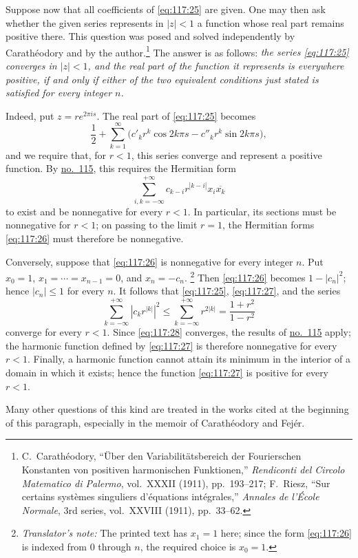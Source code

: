 \documentclass[
  paper=b5,
  fontsize=13pt,
  twoside=true,
  open=any,
  bookmarkpackage=false,
  chapterprefix=true,
  headings=normal
]{scrbook}
\theoremstyle{definition}
\newcounter{translatornote}
\newcommand{\translatornotelabel}{T\arabic{translatornote}}
\newcommand{\translatornote}[1]{%
  \stepcounter{translatornote}%
  \begingroup
    \edef\savedfootnotenumber{\number\value{footnote}}%
    \renewcommand{\thefootnote}{\translatornotelabel}%
    \footnote{\emph{Translator's note:} #1}%
    \setcounter{footnote}{\savedfootnotenumber}%
  \endgroup
}
\begin{document}
Suppose now that all coefficients of \eqref{eq:117:25} are given.  One may
then ask whether the given series represents in \(|z|<1\) a function whose
real part remains positive there.  This question was posed and solved
independently by Carathéodory and by the author.\footnote{C.~Carathéodory,
``Über den Variabilitätsbereich der Fourierschen Konstanten von positiven
harmonischen Funktionen,'' \emph{Rendiconti del Circolo Matematico di Palermo},
vol.~XXXII (1911), pp.~193--217; F.~Riesz, ``Sur certains systèmes singuliers
d'équations intégrales,'' \emph{Annales de l'École Normale}, 3rd series,
vol.~XXVIII (1911), pp.~33--62.}  The answer is as follows: \emph{the series
\eqref{eq:117:25} converges in \(|z|<1\), and the real part of the function it
represents is everywhere positive, if and only if either of the two equivalent
conditions just stated is satisfied for every integer \(n\).}

Indeed, put \(z=re^{2\pi is}\).  The real part of \eqref{eq:117:25} becomes
\begin{equation}
  \frac12+\sum_{k=1}^{\infty}
  \bigl(c'_kr^k\cos2k\pi s-c''_kr^k\sin2k\pi s\bigr),
  \tag{27}\label{eq:117:27}
\end{equation}
and we require that, for \(r<1\), this series converge and represent a
positive function.  By \hyperref[sec:115]{no.~115}, this requires the
Hermitian form
\[
  \sum_{i,k=-\infty}^{+\infty}
  c_{k-i}r^{|k-i|}x_i\overline{x_k}
\]
to exist and be nonnegative for every \(r<1\).  In particular, its sections
must be nonnegative for \(r<1\); on passing to the limit \(r=1\), the
Hermitian forms \eqref{eq:117:26} must therefore be nonnegative.

Conversely, suppose that \eqref{eq:117:26} is nonnegative for every integer
\(n\).  Put \(x_0=1\), \(x_1=\cdots=x_{n-1}=0\), and \(x_n=-c_n\).
\translatornote{The printed text has \(x_1=1\) here; since the form
\eqref{eq:117:26} is indexed from \(0\) through \(n\), the required choice is
\(x_0=1\).} Then
\eqref{eq:117:26} becomes \(1-|c_n|^2\); hence \(|c_n|\le1\) for every
\(n\).  It follows that \eqref{eq:117:25}, \eqref{eq:117:27}, and the series
\begin{equation}
  \sum_{k=-\infty}^{+\infty}|c_kr^{|k|}|^2
  \le\sum_{k=-\infty}^{+\infty}r^{2|k|}
  =\frac{1+r^2}{1-r^2}
  \tag{28}\label{eq:117:28}
\end{equation}
converge for every \(r<1\).  Since \eqref{eq:117:28} converges, the results of
\hyperref[sec:115]{no.~115} apply; the harmonic function defined by
\eqref{eq:117:27} is therefore nonnegative for every \(r<1\).  Finally, a
harmonic function cannot attain its minimum in the interior of a domain in
which it exists; hence the function \eqref{eq:117:27} is positive for every
\(r<1\).

Many other questions of this kind are treated in the works cited at the
beginning of this paragraph, especially in the memoir of Carathéodory and
Fejér.


\clearpage
{}
\tableofcontents
\end{document}
